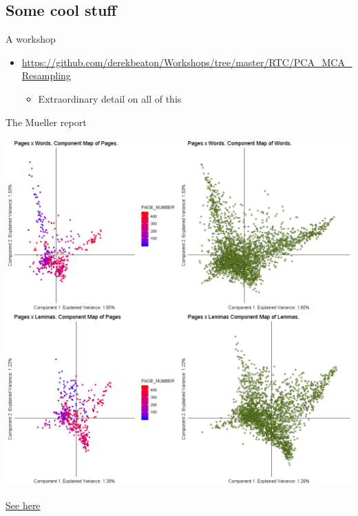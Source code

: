 \documentclass[
  ignorenonframetext,
]{beamer}
\providecommand{\tightlist}{%
  \setlength{\itemsep}{0pt}\setlength{\parskip}{0pt}}
\begin{document}
\hypertarget{some-cool-stuff}{%
\subsection{Some cool stuff}\label{some-cool-stuff}}

\begin{frame}{A workshop}
\protect\hypertarget{a-workshop}{}

\begin{itemize}[<+->]
\tightlist
\item
  \url{https://github.com/derekbeaton/Workshops/tree/master/RTC/PCA_MCA_Resampling}

  \begin{itemize}[<+->]
  \tightlist
  \item
    Extraordinary detail on all of this
  \end{itemize}
\end{itemize}

\end{frame}

\begin{frame}{The Mueller report}
\protect\hypertarget{the-mueller-report}{}

\end{frame}

\begin{frame}

\includegraphics{../images/vis_components-1.png}

\href{https://github.com/derekbeaton/muellerreport_ca}{See here}

\end{frame}
\end{document}
